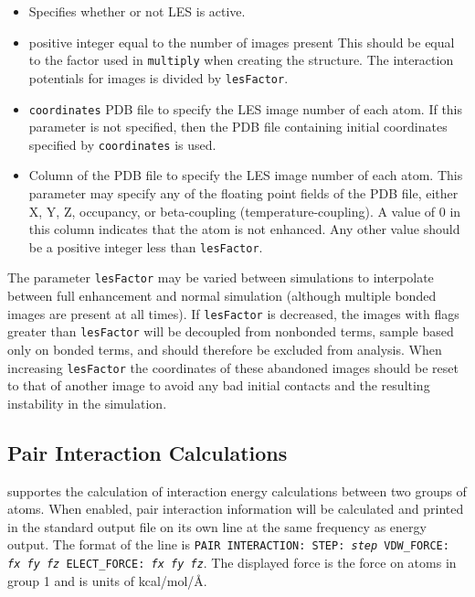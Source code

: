\begin{itemize}

\item
{}
{Specifies whether or not LES is active.}

\item
{}
{positive integer equal to the number of images present}
{This should be equal to the factor used in {\tt multiply}
 when creating the structure.  The interaction potentials for images is
 divided by {\tt lesFactor}.  
}

\item
{} {{\tt coordinates}}
{PDB file to specify the LES image number of each atom.
If this parameter is not specified, then 
the PDB file containing initial coordinates specified by 
{\tt coordinates} is used.}

\item
{}
{Column of the PDB file to specify the LES image number of each atom.
This parameter may specify any of the floating point fields of the PDB file, 
either X, Y, Z, occupancy, or beta-coupling (temperature-coupling).  
A value of 0 in this column indicates that the atom is not enhanced.
Any other value should be a positive integer less than {\tt lesFactor}.}

\end{itemize}

The parameter {\tt lesFactor} may be varied between simulations to
interpolate between full enhancement and normal simulation (although
multiple bonded images are present at all times).  If {\tt lesFactor}
is decreased, the images with flags greater than {\tt lesFactor} will
be decoupled from nonbonded terms, sample based only on bonded terms,
and should therefore be excluded from analysis.  When increasing
{\tt lesFactor} the coordinates of these abandoned images should be
reset to that of another image to avoid any bad initial contacts and
the resulting instability in the simulation.

\subsection{Pair Interaction Calculations}
\label{section:pairinteraction}
\NAMD supportes the calculation of interaction energy calculations between 
two groups of atoms.  When enabled, pair interaction information will be
calculated and printed in the standard output file on its own line at the
same frequency as energy output.  The format of the line is
{\tt PAIR INTERACTION: STEP: {\it step} VDW\_FORCE: {\it fx fy fz} 
ELECT\_FORCE: {\it fx fy fz}}.
The displayed force is the force on atoms in group 1 and is units of 
kcal/mol/\AA. 

